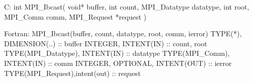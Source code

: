 C:
int MPI_Ibcast(
    void* buffer, int count, MPI_Datatype datatype,
    int root, MPI_Comm comm,
    MPI_Request *request
    )

Fortran:
MPI_Ibcast(buffer, count, datatype, root, comm, ierror)
TYPE(*), DIMENSION(..) :: buffer
INTEGER, INTENT(IN) :: count, root
TYPE(MPI_Datatype), INTENT(IN) :: datatype
TYPE(MPI_Comm), INTENT(IN) :: comm
INTEGER, OPTIONAL, INTENT(OUT) :: ierror
TYPE(MPI_Request),intent(out) :: request

